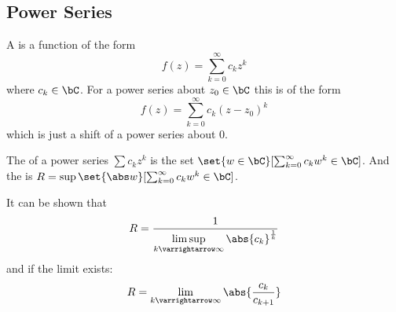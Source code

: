 \documentclass[10pt]{article}
\begin{document}
\subsection{Power Series}

\begin{defn*}

    A  is a function of the form
    \[ f(z) = \sum_{k=0}^\infty c_kz^k \]
    where $c_k\in\bC$.
    For a power series about $z_0\in\bC$ this is of the form
    \[ f(z) = \sum_{k=0}^\infty c_k(z-z_0)^k \]
    which is just a shift of a power series about $0$.

\end{defn*}

\begin{defn*}

    The  of a power series $\sum c_kz^k$ is the set $\set{w\in\bC}[\sum_{k=0}^\infty c_kw^k\in\bC]$.
    And the  is $R=\sup\set{\abs w}[\sum_{k=0}^\infty c_kw^k\in\bC]$.

\end{defn*}

It can be shown that
\[ R = \frac1{\limsup\limits_{k\varrightarrow\infty}\abs{c_k}^{\frac1k}} \]
and if the limit exists:
\[ R = \lim_{k\varrightarrow\infty}\abs{\frac{c_k}{c_{k+1}}} \]
\end{document}

